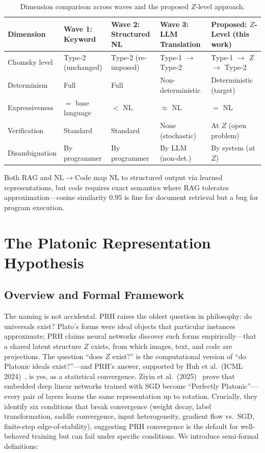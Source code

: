 \documentclass{article}
\theoremstyle{definition}
\begin{document}
\begin{table}[t]
\centering
\caption{Dimension comparison across waves and the proposed $Z$-level approach.}
\label{tab:waves}
\small
\begin{tabularx}{\textwidth}{l L L L L}
\toprule
\textbf{Dimension} & \textbf{Wave 1: Keyword} & \textbf{Wave 2: Structured NL} & \textbf{Wave 3: LLM Translation} & \textbf{Proposed: $Z$-Level (this work)} \\
\midrule
Chomsky level & Type-2 (unchanged) & Type-2 (re-imposed) & Type-1 $\to$ Type-2 & Type-1 $\to$ $Z$ $\to$ Type-2 \\
Determinism & Full & Full & Non-deterministic & Deterministic (target) \\
Expressiveness & $=$ base language & $<$ NL & $\approx$ NL & $=$ NL \\
Verification & Standard & Standard & None (stochastic) & At $Z$ (open problem) \\
Disambiguation & By programmer & By programmer & By LLM (non-det.) & By system (at $Z$) \\
\bottomrule
\end{tabularx}
\end{table}

Both RAG and NL$\to$Code map NL to structured output via learned representations, but code requires exact semantics where RAG tolerates approximation---cosine similarity $0.95$ is fine for document retrieval but a bug for program execution.


\section{The Platonic Representation Hypothesis}\label{sec:prh}

\subsection{Overview and Formal Framework}

The naming is not accidental. PRH raises the oldest question in philosophy: do universals exist? Plato's forms were ideal objects that particular instances approximate; PRH claims neural networks discover such forms empirically---that a shared latent structure $Z$ exists, from which images, text, and code are projections. The question ``does $Z$ exist?'' is the computational version of ``do Platonic ideals exist?''---and PRH's answer, supported by Huh et al.\ (ICML 2024)~\citep{huh2024platonic}, is yes, as a statistical convergence. Ziyin et al.\ (2025)~\citep{ziyin2025proof} prove that embedded deep linear networks trained with SGD become ``Perfectly Platonic''---every pair of layers learns the same representation up to rotation. Crucially, they identify six conditions that break convergence (weight decay, label transformation, saddle convergence, input heterogeneity, gradient flow vs.\ SGD, finite-step edge-of-stability), suggesting PRH convergence is the default for well-behaved training but can fail under specific conditions. We introduce semi-formal definitions:
\end{document}
